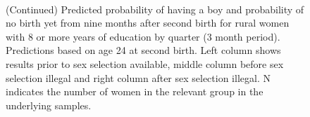 \documentclass[12pt,letterpaper]{article}
\begin{document}
\begin{figure}[htpb]
{\begin{minipage}{0.31\textwidth}
        \captionsetup[subfigure]{labelformat=empty,position=top,captionskip=-1pt,farskip=-0.5pt}
        \\
        \captionsetup[subfigure]{labelformat=parens}
    \end{minipage}
}
\setcounter{subfigure}{6}
\caption{(Continued) Predicted probability of having a boy and probability of
no birth yet from nine months after second birth for rural
women with 8 or more years of education by quarter (3 month period). 
Predictions based on age 24 at second birth.
Left column shows results prior to sex selection available, middle column before
sex selection illegal and right column after sex selection illegal.
N indicates the number of women in the relevant group in the underlying samples.
}
\end{figure}



\end{document}
